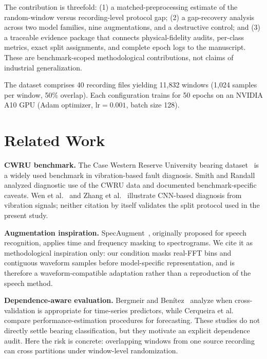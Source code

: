 ﻿\documentclass[11pt,a4paper]{article}
\begin{document}
The contribution is threefold: (1) a matched-preprocessing estimate of the random-window versus recording-level protocol gap; (2) a gap-recovery analysis across two model families, nine augmentations, and a destructive control; and (3) a traceable evidence package that connects physical-fidelity audits, per-class metrics, exact split assignments, and complete epoch logs to the manuscript. These are benchmark-scoped methodological contributions, not claims of industrial generalization.

The dataset comprises 40 recording files yielding 11,832 windows (1,024 samples per window, 50\% overlap). Each configuration trains for 50 epochs on an NVIDIA A10 GPU (Adam optimizer, $\text{lr}=0.001$, batch size 128).

\section{Related Work}

\textbf{CWRU benchmark.} The Case Western Reserve University bearing dataset~\cite{cwru} is a widely used benchmark in vibration-based fault diagnosis. Smith and Randall~\cite{smith2015rolling} analyzed diagnostic use of the CWRU data and documented benchmark-specific caveats. Wen et al.~\cite{wen2018new} and Zhang et al.~\cite{zhang2017new} illustrate CNN-based diagnosis from vibration signals; neither citation by itself validates the split protocol used in the present study.

\textbf{Augmentation inspiration.} SpecAugment~\cite{park2019specaugment}, originally proposed for speech recognition, applies time and frequency masking to spectrograms. We cite it as methodological inspiration only: our condition masks real-FFT bins and contiguous waveform samples before model-specific representation, and is therefore a waveform-compatible adaptation rather than a reproduction of the speech method.

\textbf{Dependence-aware evaluation.} Bergmeir and Ben\'{i}tez~\cite{bergmeir2012use} analyze when cross-validation is appropriate for time-series predictors, while Cerqueira et al.~\cite{cerqueira2020evaluating} compare performance-estimation procedures for forecasting. These studies do not directly settle bearing classification, but they motivate an explicit dependence audit. Here the risk is concrete: overlapping windows from one source recording can cross partitions under window-level randomization.
\end{document}
